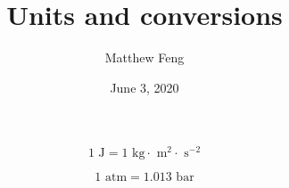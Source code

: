 \documentclass{article}
\title{Units and conversions}
\author{Matthew Feng}
\date{June 3, 2020}
\renewcommand{\b}[0]{\text{ bar}}
\newcommand{\atm}[0]{\text{ atm}}
\newcommand{\kg}[0]{\text{ kg}}
\newcommand{\J}[0]{\text{ J}}
\newcommand{\s}[0]{\text{ s}}
\newcommand{\m}[0]{\text{ m}}
\begin{document}
\maketitle

\[
    1 \J = 1 \kg \cdot \m^2 \cdot \s^{-2}
\]

\[
    1 \atm = 1.013 \b
\]
\end{document}
